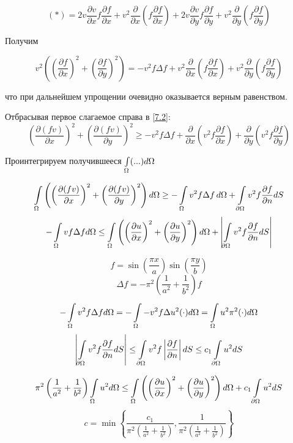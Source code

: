 \[ (*) = 2v \frac{\partial v}{\partial x} f \frac{\partial f}{\partial x} + v^2 \frac{\partial}{\partial x} \left( f \frac{\partial f}{\partial x} \right) + 2v\frac{\partial v }{\partial y} f \frac{\partial f}{\partial y} + v^2 \frac{\partial}{\partial y} \left( f \frac{\partial f}{\partial y} \right) \]

Получим

\[ v^2 \left( {\left(\frac{\partial f}{\partial x}\right)}^2 + {\left(\frac{\partial f}{\partial y}\right)}^2 \right) = - v^2 f \Delta f + v^2 \frac{\partial}{\partial x} \left( f \frac{\partial f}{\partial x} \right) + v^2 \frac{\partial}{\partial y} \left( f \frac{\partial f}{\partial y} \right) \]

что при дальнейшем упрощении очевидно оказывается верным равенством.

Отбрасывая первое слагаемое справа в \eqref{7.2}:
\[
{\left(\frac{\partial(fv)}{\partial x}\right)}^2 + {\left(\frac{\partial(fv)}{\partial y}\right)}^2 \geq - 
v^2 f\Delta f + \frac{\partial}{\partial x} \left(v^2 f \frac{\partial f }{\partial x}\right) +  \frac{\partial}{\partial y} \left(v^2 f \frac{\partial f}{\partial y} \right)
\]

Проинтегрируем получившееся $\int\limits_{\Omega} (...) d\Omega$

\[ \int\limits_{\Omega}^{} \left( {\left( \frac{\partial (fv)}{\partial x}\right)}^2 + {\left(\frac{\partial (fv)}{\partial y}\right)}^2 \right) d\Omega \geq - \int\limits_{\Omega}^{}v^2f\Delta f \, d\Omega + \int\limits_{\partial \Omega}^{}v^2 f \frac{\partial f}{\partial  n} dS \]
\[ -\int\limits_{\Omega}^{} vf \Delta f d\Omega \leq \int\limits_{\Omega} \left( {\left(\frac{\partial u }{\partial x}\right)}^2 + {\left(\frac{\partial u }{\partial y}\right)}^2 \right) d\Omega + \left| \int\limits_{\partial \Omega}^{} v^2 f \frac{\partial f}{\partial n}d S \right| \]

\[ f = \sin \left(\frac{\pi x}{a}\right) \sin \left(\frac{\pi y }{b}\right) \]
\[ \Delta f = - \pi^2 \left(\frac{1}{a^2} + \frac{1}{b^2}\right) f \]
\[ -\int\limits_{\Omega}^{}v^2 f \Delta f d\Omega = -\int\limits_{\Omega}^{} -v^2 f \Delta u^2 (\cdot) d\Omega = \int\limits_{\Omega}^{} u^2 \pi^2 (\cdot) d\Omega \]
\[ \left| \int\limits_{\partial \Omega}^{}v^2 f \frac{\partial f}{\partial n} dS \right| \leq \int\limits_{\partial  \Omega}^{} v^2 f \left| \frac{\partial f}{\partial n} \right| dS \leq c_1 \int\limits_{\partial \Omega}^{} u^2 dS \]

\[ \pi^2 \left(\frac{1}{a^2} + \frac{1}{b^2}\right) \int\limits_{\Omega}^{} u^2 d\Omega \leq \int\limits_{\Omega} \left( {\left(\frac{\partial u }{\partial x}\right)}^2 + {\left(\frac{\partial u }{\partial y}\right)}^2 \right) d\Omega + c_1 \int\limits_{\partial \Omega}^{} u^2 dS \]
\[ c = \min \left\{ \frac{c_1}{\pi^2 \left( \frac{1}{a^2} + \frac{1}{b^2}\right)}, \frac{1}{\pi^2 \left( \frac{1}{a^2} + \frac{1}{b^2}\right)} \right\} \]

